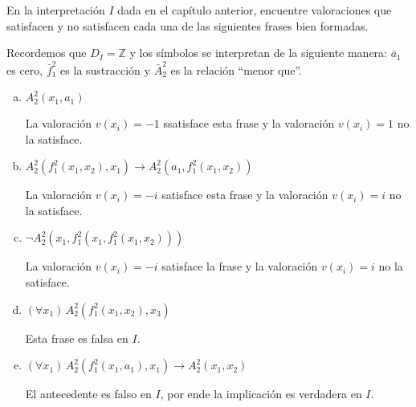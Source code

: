 \begin{exercise}
En la interpretación $I$ dada en el capítulo anterior, encuentre valoraciones que satisfacen y no satisfacen cada una de las siguientes frases bien formadas.
\end{exercise}

\begin{remark}
Recordemos que $D_I = \mathbb Z$ y los símbolos se interpretan de la siguiente manera: $\bar a_1$ es cero, $\bar f_1^2$ es la sustracción y $\bar A_2^2$ es la relación ``menor que''.
\end{remark}

\begin{enumerate}[(a)]
    \item $A_2^2(x_1, a_1)$
    \begin{solution}
    La valoración $v(x_i) = -1$ ssatisface esta frase y la valoración $v(x_i) = 1$ no la satisface.
    \end{solution}
    
    \item $A_2^2(f_1^2(x_1, x_2), x_1) \to A_2^2(a_1, f_1^2(x_1, x_2))$
    \begin{solution}
    La valoración $v(x_i) = -i$ satisface esta frase y la valoración $v(x_i) = i$ no la satisface.
    \end{solution}
    
    \item $\neg A_2^2(x_1, f_1^2(x_1, f_1^2(x_1, x_2)))$
    \begin{solution}
    La valoración $v(x_i) = -i$ satisface la frase y la valoración $v(x_i) = i$ no la satisface.
    \end{solution}
    
    \item $(\forall x_1) \, A_2^2(f_1^2(x_1, x_2), x_3)$
    \begin{solution}
    Esta frase es falsa en $I$.
    \end{solution}
    
    \item $(\forall x_1) \, A_2^2(f_1^2(x_1, a_1), x_1) \to A_2^2(x_1, x_2)$
    \begin{solution}
    El antecedente es falso en $I$, por ende la implicación es verdadera en $I$.
    \end{solution}
\end{enumerate}
